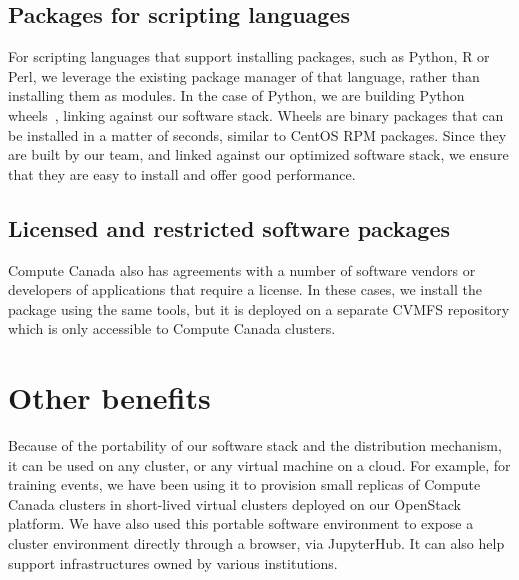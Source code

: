 \documentclass[sigconf]{acmart}
\begin{document}
\subsection{Packages for scripting languages}
\label{sub:Packages_for_scripting_languages}
For scripting languages that support installing packages, such as Python, R or Perl, we leverage the existing package manager of that language, rather than installing them as modules. In the case of Python, we are building Python wheels~\cite{Wheels}, linking against our software stack. Wheels are binary packages that can be installed in a matter of seconds, similar to CentOS RPM packages. Since they are built by our team, and linked against our optimized software stack, we ensure that they are easy to install and offer good performance.

\subsection{Licensed and restricted software packages}
\label{sub:Licensed_software_packages}
Compute Canada also has agreements with a number of software vendors or developers of applications that require a license. In these cases, we install the package using the same tools, but it is deployed on a separate CVMFS repository which is only accessible to Compute Canada clusters.

\section{Other benefits}
\label{sec:Other_benefits}
Because of the portability of our software stack and the distribution mechanism, it can be used on any cluster, or any virtual machine on a cloud. For example, for training events, we have been using it to provision small replicas of Compute Canada clusters in short-lived virtual clusters deployed on our OpenStack platform. We have also used this portable software environment to expose a cluster environment directly through a browser, via JupyterHub. It can also help support infrastructures owned by various institutions.
\end{document}
